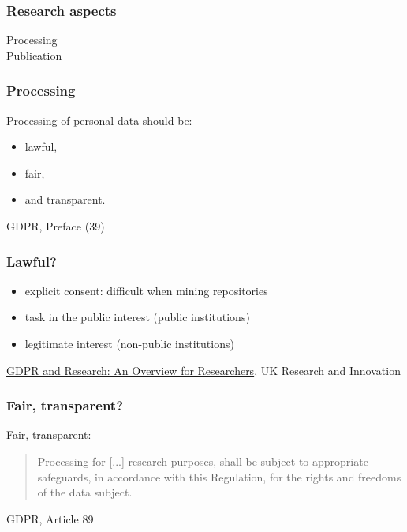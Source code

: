 \documentclass[17pt,aspectratio=169,hyperref={pdfusetitle,colorlinks,allcolors=olive}]{beamer}
\begin{document}
\begin{frame}[fragile]
  \frametitle{Research aspects}

  {\Large

    Processing \\
    \vspace{1cm}
    Publication \\
  }
\end{frame}

\begin{frame}[fragile]
  \frametitle{Processing}

  Processing of personal data should be:

  \begin{itemize}
  \item lawful,
  \item fair,
  \item and transparent.
  \end{itemize}

  \begin{flushright}
    GDPR, Preface (39)
  \end{flushright}

\end{frame}

\begin{frame}[fragile]
  \frametitle{Lawful?}

  \begin{itemize}
  \item explicit consent: difficult when mining repositories
  \item task in the public interest (public institutions)
  \item legitimate interest (non-public institutions)
  \end{itemize}

  \begin{flushright}
    \href{https://www.ukri.org/files/about/policy/ukri-gdpr-faqs-pdf}{GDPR and Research: An Overview for Researchers}, UK Research and Innovation
  \end{flushright}
\end{frame}

\begin{frame}[fragile]
  \frametitle{Fair, transparent?}

  Fair, transparent:
  
  \begin{quote}
  Processing for [...] research purposes, shall be subject to appropriate safeguards, in accordance with this Regulation, for the rights and freedoms of
the data subject.
  \end{quote}

  \begin{flushright}
    GDPR, Article 89
  \end{flushright}
\end{frame}
\end{document}
